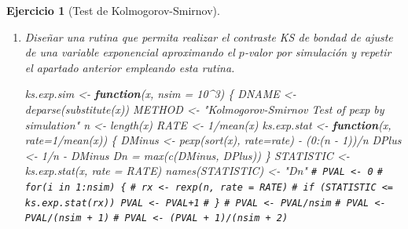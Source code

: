 \documentclass[
  10pt,
]{book}
\newenvironment{Shaded}{\begin{snugshade}}{\end{snugshade}}
\newcommand{\AttributeTok}[1]{\textcolor[rgb]{0.77,0.63,0.00}{#1}}
\newcommand{\CommentTok}[1]{\textcolor[rgb]{0.56,0.35,0.01}{\textit{#1}}}
\newcommand{\ControlFlowTok}[1]{\textcolor[rgb]{0.13,0.29,0.53}{\textbf{#1}}}
\newcommand{\DecValTok}[1]{\textcolor[rgb]{0.00,0.00,0.81}{#1}}
\newcommand{\FunctionTok}[1]{\textcolor[rgb]{0.00,0.00,0.00}{#1}}
\newcommand{\NormalTok}[1]{#1}
\newcommand{\OtherTok}[1]{\textcolor[rgb]{0.56,0.35,0.01}{#1}}
\newcommand{\SpecialCharTok}[1]{\textcolor[rgb]{0.00,0.00,0.00}{#1}}
\newcommand{\StringTok}[1]{\textcolor[rgb]{0.31,0.60,0.02}{#1}}
\theoremstyle{break}
\newtheorem{exercise}{Ejercicio}[chapter]
\theoremstyle{nonumberplain}
\renewcommand{\CommentTok}[1]{\textcolor[rgb]{0.41,0.41,0.41}{\texttt{#1}}}
\begin{document}
\begin{exercise}[Test de Kolmogorov-Smirnov]
\begin{enumerate}
  \begin{center}\texttt{[image: 07-Monte\_Carlo\_files/figure-latex/unnamed-chunk-55-1]} \texttt{[image: 07-Monte\_Carlo\_files/figure-latex/unnamed-chunk-55-2]} \end{center}
\item
  Diseñar una rutina que permita realizar el contraste KS de
  bondad de ajuste de una variable exponencial aproximando el
  \(p\)-valor por simulación y repetir el apartado anterior
  empleando esta rutina.

\begin{Shaded}
\begin{Highlighting}[]
\NormalTok{ks.exp.sim }\OtherTok{\textless{}{-}} \ControlFlowTok{function}\NormalTok{(x, }\AttributeTok{nsim =} \DecValTok{10}\SpecialCharTok{\^{}}\DecValTok{3}\NormalTok{) \{}
\NormalTok{  DNAME }\OtherTok{\textless{}{-}} \FunctionTok{deparse}\NormalTok{(}\FunctionTok{substitute}\NormalTok{(x))}
\NormalTok{  METHOD }\OtherTok{\textless{}{-}} \StringTok{"Kolmogorov{-}Smirnov Test of pexp by simulation"} 
\NormalTok{  n }\OtherTok{\textless{}{-}} \FunctionTok{length}\NormalTok{(x)}
\NormalTok{  RATE }\OtherTok{\textless{}{-}} \DecValTok{1}\SpecialCharTok{/}\FunctionTok{mean}\NormalTok{(x)}
\NormalTok{  ks.exp.stat }\OtherTok{\textless{}{-}} \ControlFlowTok{function}\NormalTok{(x, }\AttributeTok{rate=}\DecValTok{1}\SpecialCharTok{/}\FunctionTok{mean}\NormalTok{(x)) \{}
\NormalTok{    DMinus }\OtherTok{\textless{}{-}} \FunctionTok{pexp}\NormalTok{(}\FunctionTok{sort}\NormalTok{(x), }\AttributeTok{rate=}\NormalTok{rate) }\SpecialCharTok{{-}}\NormalTok{ (}\DecValTok{0}\SpecialCharTok{:}\NormalTok{(n }\SpecialCharTok{{-}} \DecValTok{1}\NormalTok{))}\SpecialCharTok{/}\NormalTok{n}
\NormalTok{    DPlus }\OtherTok{\textless{}{-}} \DecValTok{1}\SpecialCharTok{/}\NormalTok{n }\SpecialCharTok{{-}}\NormalTok{ DMinus}
\NormalTok{    Dn }\OtherTok{=} \FunctionTok{max}\NormalTok{(}\FunctionTok{c}\NormalTok{(DMinus, DPlus))}
\NormalTok{  \}  }
\NormalTok{  STATISTIC }\OtherTok{\textless{}{-}} \FunctionTok{ks.exp.stat}\NormalTok{(x, }\AttributeTok{rate =}\NormalTok{ RATE) }
  \FunctionTok{names}\NormalTok{(STATISTIC) }\OtherTok{\textless{}{-}} \StringTok{"Dn"}
  \CommentTok{\# PVAL \textless{}{-} 0}
  \CommentTok{\# for(i in 1:nsim) \{}
  \CommentTok{\#   rx \textless{}{-} rexp(n, rate = RATE)}
  \CommentTok{\#   if (STATISTIC \textless{}= ks.exp.stat(rx)) PVAL \textless{}{-} PVAL+1}
  \CommentTok{\# \}}
  \CommentTok{\# PVAL \textless{}{-} PVAL/nsim}
  \CommentTok{\# PVAL \textless{}{-} PVAL/(nsim + 1)}
  \CommentTok{\# PVAL \textless{}{-} (PVAL + 1)/(nsim + 2)}

\end{Highlighting}
\end{Shaded}
\end{enumerate}
\end{exercise}
\end{document}
